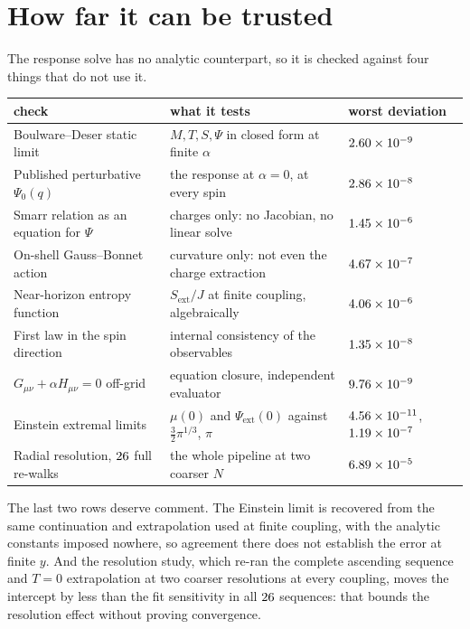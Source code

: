 \documentclass[10pt,a4paper]{article}
\newcommand{\ext}{\mathrm{ext}}
\begin{document}
\section*{How far it can be trusted}

The response solve has no analytic counterpart, so it is checked against four
things that do not use it.

\begin{center}\footnotesize
\begin{tabular}{@{}lll@{}}
\toprule
check & what it tests & worst deviation \\
\midrule
Boulware--Deser static limit & $M,T,S,\Psi$ in closed form at finite $\alpha$ & $2.60\times 10^{-9}$ \\
Published perturbative $\Psi_0(q)$ & the response at $\alpha=0$, at every spin & $2.86\times 10^{-8}$ \\
Smarr relation as an equation for $\Psi$ & charges only: no Jacobian, no linear solve & $1.45\times 10^{-6}$ \\
On-shell Gauss--Bonnet action & curvature only: not even the charge extraction & $4.67\times 10^{-7}$ \\
Near-horizon entropy function & $S_\ext/J$ at finite coupling, algebraically & $4.06\times 10^{-6}$ \\
First law in the spin direction & internal consistency of the observables & $1.35\times 10^{-8}$ \\
$G_{\mu\nu}+\alpha H_{\mu\nu}=0$ off-grid & equation closure, independent evaluator & $9.76\times 10^{-9}$ \\
Einstein extremal limits & $\mu(0)$ and $\Psi_\ext(0)$ against $\tfrac32\pi^{1/3}$, $\pi$ &
 $4.56\times 10^{-11}$, $1.19\times 10^{-7}$ \\
Radial resolution, $26$ full re-walks & the whole pipeline at two coarser $N$ & $6.89\times 10^{-5}$ \\
\bottomrule
\end{tabular}
\end{center}

The last two rows deserve comment. The Einstein limit is recovered from the
same continuation and extrapolation used at finite coupling, with the analytic
constants imposed nowhere, so agreement there does not establish the error at
finite $y$. And the resolution study, which re-ran the complete ascending
sequence and $T=0$ extrapolation at two coarser resolutions at every coupling,
moves the intercept by less than the fit sensitivity in all $26$
sequences: that bounds the resolution effect without proving convergence.
\end{document}
